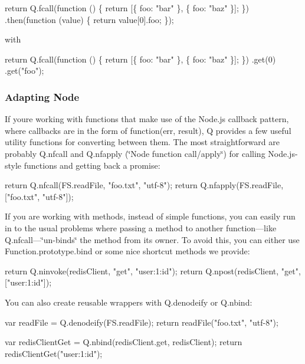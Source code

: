 \begin{DoxyCode}
return Q.fcall(function () \{
    return [\{ foo: "bar" \}, \{ foo: "baz" \}];
\})
.then(function (value) \{
    return value[0].foo;
\});
\end{DoxyCode}


with


\begin{DoxyCode}
return Q.fcall(function () \{
    return [\{ foo: "bar" \}, \{ foo: "baz" \}];
\})
.get(0)
.get("foo");
\end{DoxyCode}


\subsubsection*{Adapting Node}

If you\textquotesingle{}re working with functions that make use of the Node.\+js callback pattern, where callbacks are in the form of {\ttfamily function(err, result)}, Q provides a few useful utility functions for converting between them. The most straightforward are probably {\ttfamily Q.\+nfcall} and {\ttfamily Q.\+nfapply} (\char`\"{}\+Node function call/apply\char`\"{}) for calling Node.\+js-\/style functions and getting back a promise\+:


\begin{DoxyCode}
return Q.nfcall(FS.readFile, "foo.txt", "utf-8");
return Q.nfapply(FS.readFile, ["foo.txt", "utf-8"]);
\end{DoxyCode}


If you are working with methods, instead of simple functions, you can easily run in to the usual problems where passing a method to another function—like {\ttfamily Q.\+nfcall}—\char`\"{}un-\/binds\char`\"{} the method from its owner. To avoid this, you can either use {\ttfamily Function.\+prototype.\+bind} or some nice shortcut methods we provide\+:


\begin{DoxyCode}
return Q.ninvoke(redisClient, "get", "user:1:id");
return Q.npost(redisClient, "get", ["user:1:id"]);
\end{DoxyCode}


You can also create reusable wrappers with {\ttfamily Q.\+denodeify} or {\ttfamily Q.\+nbind}\+:


\begin{DoxyCode}
var readFile = Q.denodeify(FS.readFile);
return readFile("foo.txt", "utf-8");

var redisClientGet = Q.nbind(redisClient.get, redisClient);
return redisClientGet("user:1:id");
\end{DoxyCode}


